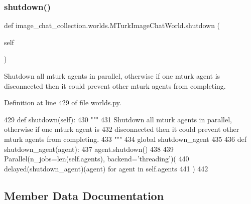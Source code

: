 \subsubsection{\texorpdfstring{shutdown()}{shutdown()}}
{\footnotesize\ttfamily def image\+\_\+chat\+\_\+collection.\+worlds.\+M\+Turk\+Image\+Chat\+World.\+shutdown (\begin{DoxyParamCaption}\item[{}]{self }\end{DoxyParamCaption})}

\begin{DoxyVerb}Shutdown all mturk agents in parallel, otherwise if one mturk agent is
disconnected then it could prevent other mturk agents from completing.
\end{DoxyVerb}
 

Definition at line 429 of file worlds.\+py.


\begin{DoxyCode}
429     \textcolor{keyword}{def }shutdown(self):
430         \textcolor{stringliteral}{"""}
431 \textcolor{stringliteral}{        Shutdown all mturk agents in parallel, otherwise if one mturk agent is}
432 \textcolor{stringliteral}{        disconnected then it could prevent other mturk agents from completing.}
433 \textcolor{stringliteral}{        """}
434         \textcolor{keyword}{global} shutdown\_agent
435 
436         \textcolor{keyword}{def }shutdown\_agent(agent):
437             agent.shutdown()
438 
439         Parallel(n\_jobs=len(self.agents), backend=\textcolor{stringliteral}{'threading'})(
440             delayed(shutdown\_agent)(agent) \textcolor{keywordflow}{for} agent \textcolor{keywordflow}{in} self.agents
441         )
442 \end{DoxyCode}


\subsection{Member Data Documentation}
\mbox{\label{classimage__chat__collection_1_1worlds_1_1MTurkImageChatWorld_a8a1e906514af9c95bb1e859400c79a7c}} 
